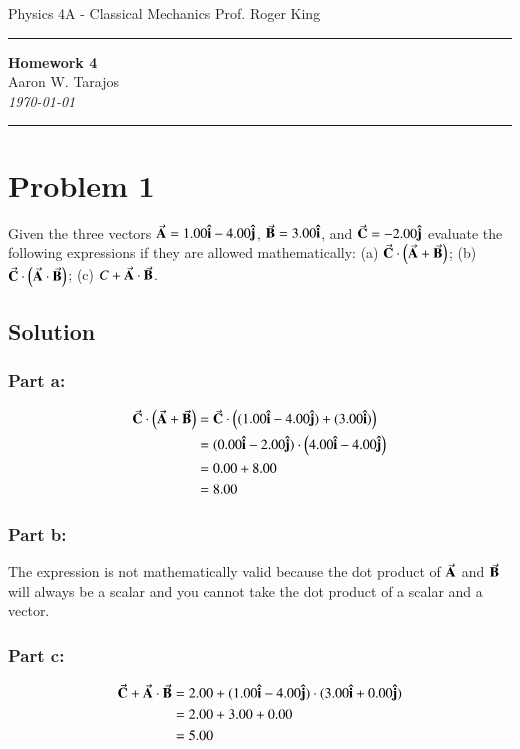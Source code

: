 \documentclass{article}
\begin{document}
\noindent
Physics 4A - Classical Mechanics \hfill Prof. Roger King

\noindent\rule{\textwidth}{0.4pt}

\begin{center}
    \textbf{\LARGE Homework 4} \\
    \vspace{12pt}
    \large Aaron W. Tarajos \\
    \textit{\today}
\end{center}

\noindent\rule{\textwidth}{0.4pt}

\section*{Problem 1}
Given the three vectors $\va A = 1.00 \vu i  -4.00 \vu j$, $\va B = 3.00 \vu i$, and $\va C = -2.00 \vu j$ evaluate the following expressions if they are allowed mathematically: (a) $\va C \cdot \left( \va A + \va B \right)$; (b) $\va C \cdot \left( \va A \cdot \va B \right)$; (c) $C + \va A \cdot \va B$.

\subsection*{Solution}
\subsubsection*{Part a:}
\begin{align*}
	\va C \cdot \left( \va A + \va B \right) &= \va C \cdot \left((1.00 \vu i  -4.00 \vu j) + (3.00 \vu i)\right) \\
	&= (0.00 \vu i -2.00 \vu j) \cdot \left( 4.00 \vu i -4.00 \vu j\right) \\
	&= 0.00 + 8.00 \\
	&= 8.00
\end{align*}

\subsubsection*{Part b:}
The expression is not mathematically valid because the dot product of $\va A$ and $\va B$ will always be a scalar and you cannot take the dot product of a scalar and a vector.

\subsubsection*{Part c:}
\begin{align*}
	\va C + \va A \cdot \va B &= 2.00 + (1.00 \vu i  -4.00 \vu j) \cdot (3.00 \vu i + 0.00 \vu j) \\
				  &= 2.00 + 3.00 + 0.00 \\
				  &= 5.00
\end{align*}
\end{document}
